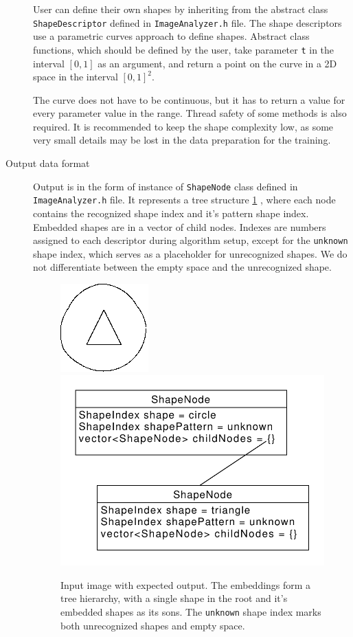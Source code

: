 \begin{description}
User  can define their own shapes by inheriting from the abstract class \texttt{ShapeDescriptor} defined in \texttt{ImageAnalyzer.h} file. The shape descriptors use a  parametric curves approach to define shapes.  Abstract class functions, which should be defined by the user, take parameter \texttt{t} in the interval $[0,1]$ as an argument, and return a point on the curve in a 2D space in the interval $[0,1]^2$.

The curve does not have to be continuous, but it has to return a value for every parameter value in the range. Thread safety of some methods is also required. It is  recommended to keep the shape complexity low, as some very small details may be lost in the data preparation for the training. 

\item [Output data format]
Output  is in the form of instance of \texttt{ShapeNode} class defined in \texttt{ImageAnalyzer.h} file. It represents a tree structure \ref{fig:output0} , where each node contains the recognized shape index and it's  pattern shape index. Embedded shapes are  in a vector of child nodes. Indexes are numbers assigned to each descriptor during algorithm setup, except for the \texttt{unknown} shape index, which serves as a placeholder for unrecognized shapes. We do not differentiate between the empty space and  the unrecognized shape.

\begin{figure}[p]
\centering
\includegraphics[width=.3\linewidth]{ext/images/example_output0.png}
\quad
\includegraphics[width=.3\linewidth]{ext/images/example_output0.pdf}
\caption{Input image with expected output. The embeddings form a tree hierarchy, with a single shape in the root and it's embedded shapes as its sons. The \texttt{unknown} shape index marks both unrecognized shapes and empty space.}
\label{fig:output0}
\end{figure}


\end{description}
